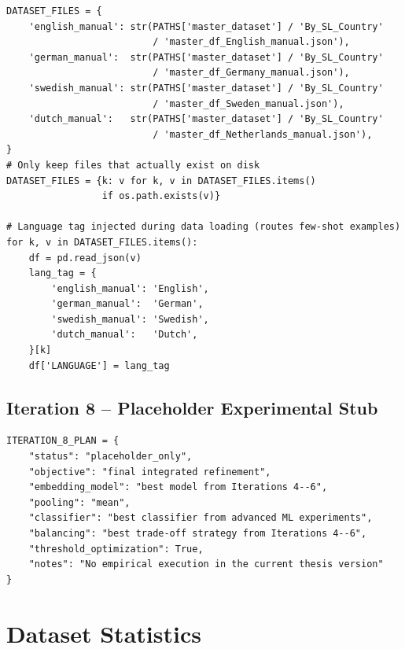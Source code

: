 \documentclass[11pt, titlepage, bibliography=totoc]{scrreprt}
\begin{document}
\begin{lstlisting}[label=lst:lang-files,
  caption={Language-to-dataset file mapping used to route each record to the appropriate few-shot example bank in Iteration~7.}]
DATASET_FILES = {
    'english_manual': str(PATHS['master_dataset'] / 'By_SL_Country'
                          / 'master_df_English_manual.json'),
    'german_manual':  str(PATHS['master_dataset'] / 'By_SL_Country'
                          / 'master_df_Germany_manual.json'),
    'swedish_manual': str(PATHS['master_dataset'] / 'By_SL_Country'
                          / 'master_df_Sweden_manual.json'),
    'dutch_manual':   str(PATHS['master_dataset'] / 'By_SL_Country'
                          / 'master_df_Netherlands_manual.json'),
}
# Only keep files that actually exist on disk
DATASET_FILES = {k: v for k, v in DATASET_FILES.items()
                 if os.path.exists(v)}

# Language tag injected during data loading (routes few-shot examples)
for k, v in DATASET_FILES.items():
    df = pd.read_json(v)
    lang_tag = {
        'english_manual': 'English',
        'german_manual':  'German',
        'swedish_manual': 'Swedish',
        'dutch_manual':   'Dutch',
    }[k]
    df['LANGUAGE'] = lang_tag
\end{lstlisting}

\subsection*{Iteration 8 -- Placeholder Experimental Stub}

\begin{lstlisting}[label=lst:iter8-placeholder,
  caption={Placeholder stub for Iteration~8, reserved for final integrated refinement of the strongest components identified in earlier iterations.}]
ITERATION_8_PLAN = {
    "status": "placeholder_only",
    "objective": "final integrated refinement",
    "embedding_model": "best model from Iterations 4--6",
    "pooling": "mean",
    "classifier": "best classifier from advanced ML experiments",
    "balancing": "best trade-off strategy from Iterations 4--6",
    "threshold_optimization": True,
    "notes": "No empirical execution in the current thesis version"
}
\end{lstlisting}

\section{Dataset Statistics}
\end{document}
